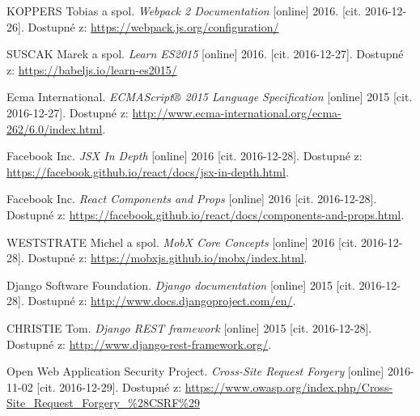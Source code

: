 \documentclass[a4paper,11pt,titlepage,fleqn]{article}
\begin{document}
\begin{thebibliography}{99}
        KOPPERS Tobias a spol. \textit{Webpack 2 Documentation} [online] 2016. [cit. 2016-12-26]. Dostupné z: \url{https://webpack.js.org/configuration/}

        SUSCAK Marek a spol. \textit{Learn ES2015} [online] 2016. [cit. 2016-12-27]. Dostupné z: \url{https://babeljs.io/learn-es2015/}
        
        Ecma International. \textit{ECMAScript® 2015 Language Specification} [online] 2015 [cit. 2016-12-27]. Dostupné z: \url{http://www.ecma-international.org/ecma-262/6.0/index.html}.

        Facebook Inc. \textit{JSX In Depth} [online] 2016 [cit. 2016-12-28]. Dostupné z: \url{https://facebook.github.io/react/docs/jsx-in-depth.html}.

        Facebook Inc. \textit{React Components and Props} [online] 2016 [cit. 2016-12-28]. Dostupné z: \url{https://facebook.github.io/react/docs/components-and-props.html}.
        
        WESTSTRATE Michel a spol. \textit{MobX Core Concepts} [online] 2016 [cit. 2016-12-28].
        Dostupné z: \url{https://mobxjs.github.io/mobx/index.html}.

        Django Software Foundation. \textit{Django documentation} [online] 2015 [cit. 2016-12-28]. Dostupné z: \url{http://www.docs.djangoproject.com/en/}.

        CHRISTIE Tom. \textit{Django REST framework} [online] 2015 [cit. 2016-12-28]. Dostupné z: \url{http://www.django-rest-framework.org/}.

       Open Web Application Security Project. \textit{Cross-Site Request Forgery} [online] 2016-11-02 [cit. 2016-12-29]. Dostupné z: \url{https://www.owasp.org/index.php/Cross-Site_Request_Forgery_%28CSRF%29}
        
\end{thebibliography}
\end{document}
